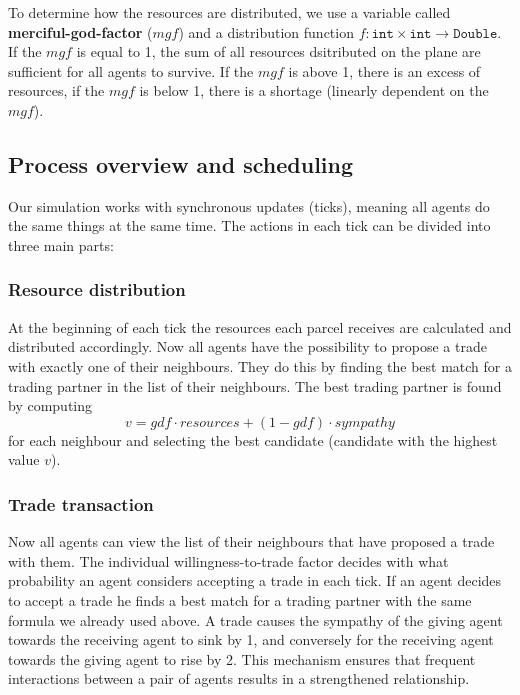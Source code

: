 \documentclass{JASSS}
\begin{document}
To determine how the resources are distributed, we use a variable called \textbf{merciful-god-factor} ($mgf$) and a distribution function $f: \texttt{int} \times \texttt{int} \to \texttt{Double}$. If the $mgf$ is equal to 1, the sum of all resources dsitributed on the plane are sufficient for all agents to survive. If the $mgf$ is above 1, there is an excess of resources, if the $mgf$ is below 1, there is a shortage (linearly dependent on the $mgf$).


\subsection{Process overview and scheduling}
Our simulation works with synchronous updates (ticks), meaning all agents do the same things at the same time. The actions in each tick can be divided into three main parts:
\subsubsection{Resource distribution}
		    At the beginning of each tick the resources each parcel receives are calculated and distributed accordingly. Now all agents have the possibility to propose a trade with exactly one of their neighbours. They do this by finding the best match for a trading partner in the list of their neighbours. The best trading partner is found by computing
	$$v = gdf \cdot resources + (1-gdf) \cdot sympathy$$
for each neighbour and selecting the best candidate (candidate with the highest value $v$).

\subsubsection{Trade transaction}
	 Now all agents can view the list of their neighbours that have proposed a trade with them. The individual willingness-to-trade factor decides with what probability an agent considers accepting a trade in each tick. If an agent decides to accept a trade he finds a best match for a trading partner with the same formula we already used above. A trade causes the sympathy of the giving agent towards the receiving agent to sink by 1, and conversely for the receiving agent towards the giving agent to rise by 2. This mechanism ensures that frequent interactions between a pair of agents results in a strengthened relationship.\\
\end{document}
